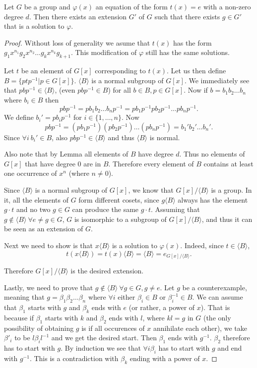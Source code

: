 \begin{thm}
	Let $G$ be a group and $\varphi(x)$ an equation of the form $t(x)=e$ with a non-zero degree $d$. Then there exists an extension $G'$ of $G$ such that there exists $g\in G'$ that is a solution to $\varphi$.
\end{thm}
\begin{proof}
Without loss of generality we asume that $t(x)$ has the form $g_1 x^{n_1}g_2 x^{n_2}\dots g_k x^{n_k}g_{k+1}$. This modification of $\varphi$ still has the same solutions.

Let $t$ be an element of $G[x]$ corresponding to $t(x)$. Let us then define $B=\{ptp^{-1}|p\in G[x]\}$. $\langle B\rangle$ is a normal subgroup of $G[x]$. We immediately see that $pbp^{-1}\in \langle B\rangle$, (even $pbp^{-1}\in B$) for all $b\in B, p\in G[x]$. Now if $b=b_1 b_2\dots b_n$ where $b_i\in B$ then $$pbp^{-1}=pb_1 b_2\dots b_np^{-1}=pb_1p^{-1}p b_2p^{-1}\dots pb_np^{-1}.$$
We define ${b_i}'=pb_ip^{-1}$ for $i\in\{1,\dots,n\}$. Now $$pbp^{-1}=(pb_1p^{-1})(p b_2p^{-1})\dots (pb_np^{-1})={b_1}'{b_2}'\dots{b_n}'.$$
Since $\forall i\ {b_i}'\in B$, also $pbp^{-1}\in \langle B\rangle$ and thus $\langle B \rangle$ is normal.

Also note that by Lemma  all elements of $B$ have degree $d$. Thus no elements of $G[x]$ that have degree 0 are in $B$. Therefore every element of $B$ contains at least one occurrence of $x^n$ (where $n\neq 0$). 

Since $\langle B \rangle$ is a normal subgroup of $G[x]$, we know that $G[x]/\langle B \rangle$ is a group. In it, all the elements of $G$ form different cosets, since $g\langle B \rangle$ always has the element $g\cdot t$ and no two $g\in G$ can produce the same $g\cdot t$. Assuming that $g\notin \langle B \rangle\ \forall e\neq g\in G$, $G$ is isomorphic to a subgroup of $G[x]/\langle B \rangle$, and thus it can be seen as an extension of $G$.

Next we need to show is that $x \langle B \rangle$ is a solution to $\varphi(x)$. Indeed, since $t\in\langle B \rangle$, $$t(x\langle B \rangle)=t(x)\langle B \rangle=\langle B \rangle=e_{G[x]/\langle B \rangle}.$$

Therefore $G[x]/\langle B \rangle$ is the desired extension.

Lastly, we need to prove that $g\notin \langle B \rangle\ \forall g\in G, g\neq e$. Let $g$ be a counterexample, meaning that $g=\beta_1\beta_2\dots \beta_n$ where $\forall i$ either $\beta_i\in B$ or $\beta_i^{-1}\in B$. We can assume that $\beta_1$ starts with $g$ and $\beta_k$ ends with $e$ (or rather, a power of $x$). That is because if $\beta_1$ starts with $k$ and $\beta_2$ ends with $l$, where $kl=g$ in $G$ (the only possibility of obtaining $g$ is if all occurences of $x$ annihilate each other), we take $\beta'_i$ to be $l\beta_il^{-1}$ and we get the desired start. Then $\beta_1$ ends with $g^{-1}$. $\beta_2$ therefore has to start with $g$. By induction we see that $\forall i \beta_i$ has to start with $g$ and end with $g^{-1}$. This is a contradiction with $\beta_k$ ending with a power of $x$.
\end{proof}

